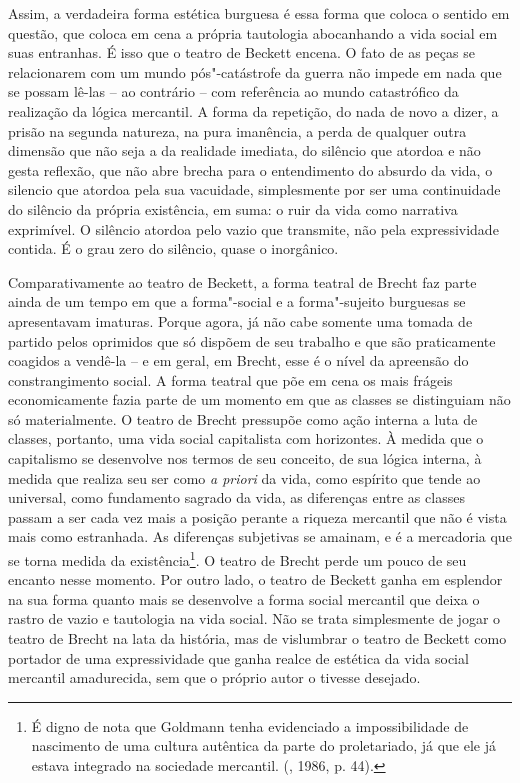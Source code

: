 Assim, a verdadeira forma estética burguesa é essa forma que coloca o
sentido em questão, que coloca em cena a própria tautologia abocanhando
a vida social em suas entranhas. É isso que o teatro de Beckett encena.
O fato de as peças se relacionarem com um mundo pós"-catástrofe da guerra
não impede em nada que se possam lê-las -- ao contrário -- com
referência ao mundo catastrófico da realização da lógica mercantil. A
forma da repetição, do nada de novo a dizer, a prisão na segunda
natureza, na pura imanência, a perda de qualquer outra dimensão que não
seja a da realidade imediata, do silêncio que atordoa e não gesta
reflexão, que não abre brecha para o entendimento do absurdo da vida, o
silencio que atordoa pela sua vacuidade, simplesmente por ser uma
continuidade do silêncio da própria existência, em suma: o ruir da vida
como narrativa exprimível. O silêncio atordoa pelo vazio que transmite,
não pela expressividade contida. É o grau zero do silêncio, quase o
inorgânico.

Comparativamente ao teatro de Beckett, a forma teatral de Brecht faz
parte ainda de um tempo em que a forma"-social e a forma"-sujeito
burguesas se apresentavam imaturas. Porque agora, já não cabe somente
uma tomada de partido pelos oprimidos que só dispõem de seu trabalho e
que são praticamente coagidos a vendê-la -- e em geral, em Brecht, esse
é o nível da apreensão do constrangimento social. A forma teatral que
põe em cena os mais frágeis economicamente fazia parte de um momento em
que as classes se distinguiam não só materialmente. O teatro de Brecht
pressupõe como ação interna a luta de classes, portanto, uma vida social
capitalista com horizontes. À medida que o capitalismo se desenvolve nos
termos de seu conceito, de sua lógica interna, à medida que realiza seu
ser como \emph{a priori} da vida, como espírito que tende ao universal,
como fundamento sagrado da vida, as diferenças entre as classes passam a
ser cada vez mais a posição perante a riqueza mercantil que não é vista
mais como estranhada. As diferenças subjetivas se amainam, e é a
mercadoria que se torna medida da existência\footnote{É digno de nota
  que Goldmann tenha evidenciado a impossibilidade de nascimento de uma
  cultura autêntica da parte do proletariado, já que ele já estava
  integrado na sociedade mercantil. (, 1986, p. 44).}. O teatro
de Brecht perde um pouco de seu encanto nesse momento. Por outro lado, o
teatro de Beckett ganha em esplendor na sua forma quanto mais se
desenvolve a forma social mercantil que deixa o rastro de vazio e
tautologia na vida social. Não se trata simplesmente de jogar o teatro
de Brecht na lata da história, mas de vislumbrar o teatro de Beckett
como portador de uma expressividade que ganha realce de estética da vida
social mercantil amadurecida, sem que o próprio autor o tivesse
desejado.

